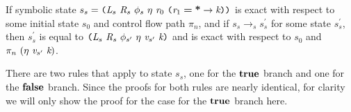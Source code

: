 \begin{lemma}
\label{lem:compare}
If symbolic state $s_s =  \lp \cfgnt{L}_s\ \cfgnt{R}_s\ \phi_s\ \eta\ \cfgnt{r}_0\ \lp \cfgnt{r}_1\; \cfgt{=}\; \cfgt{*} \rightarrow \cfgnt{k}\rp \rp$ is exact with respect to some initial state $s_0$ and control flow path $\pi_n$, and if $s_s \rightarrow_s s_s^\prime$ for some state $s_s^\prime$, then $s_s^\prime$ is equal to $ \lp \cfgnt{L}_s\ \cfgnt{R}_s\ \phi_{s^\prime}\ \eta\ \cfgnt{v}_{s^\prime}\ \cfgnt{k}\rp$ and is exact with respect to $s_0$ and $\pi_n \ (\eta\ \cfgnt{v}_{s^\prime}\ \cfgnt{k})$.
\end{lemma}
There are two rules that apply to state $s_s$, one for the $\textbf{true}$ branch and one for the $\textbf{false}$ branch. Since the proofs for both rules are nearly identical, for clarity we will only show the proof for the case for the $\textbf{true}$ branch here. 
